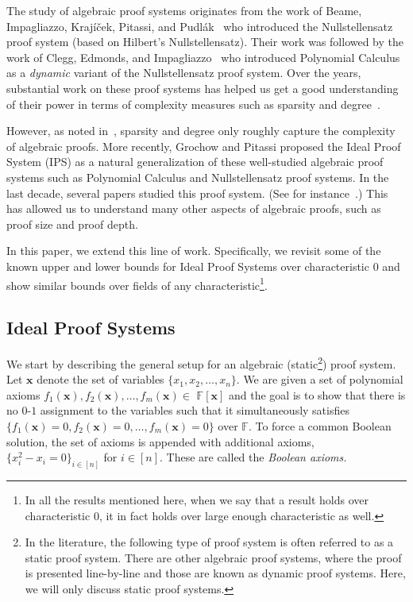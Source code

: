 \documentclass[11pt]{article}
\newcommand{\xbar}{\mathbf{x}}
\begin{document}
The study of algebraic proof systems originates from the work of Beame, Impagliazzo, Kraj\'{i}\v{c}ek, Pitassi, and Pudl\'{a}k~\cite{BIKPP94}  who introduced the Nullstellensatz proof system (based on Hilbert's Nullstellensatz). Their work was followed by the work of Clegg, Edmonds, and Impagliazzo~\cite{CEI96} who introduced Polynomial Calculus as a \emph{dynamic} variant of the Nullstellensatz proof system. Over the years, substantial work on these proof systems has helped us get a good understanding of their power in terms of complexity measures such as sparsity and degree~\cite{BIKPP94,BIPRS97,Razborov98,Grigoriev98,IPS99,BGIP01,AR2001}. 

However, as noted in~\cite{FSTW21}, sparsity and degree only roughly capture the complexity of algebraic proofs. More recently, Grochow and Pitassi \cite{GP14} proposed the Ideal Proof System (IPS) as a natural generalization of these well-studied algebraic proof systems such as Polynomial Calculus and Nullstellensatz proof systems. In the last decade, several papers studied this proof system. (See for instance~\cite{GP14,PitassiTzameretSurvey,FSTW21,GHT,HLT24}.) This has allowed us to understand many other aspects of algebraic proofs, such as proof size and proof depth. 

In this paper, we extend this line of work. Specifically, we revisit some of the known upper and lower bounds for Ideal Proof Systems over characteristic $0$ and show similar bounds over fields of any characteristic\footnote{In all the results mentioned here, when we say that a result holds over characteristic $0$, it in fact holds over large enough characteristic as well.}. 



\subsection{Ideal Proof Systems}
\label{sec:intro-ips}

We start by describing the general setup for an algebraic (static\footnote{In the literature, the following type of proof system is often referred to as a static proof system. There are other algebraic proof systems, where the proof is presented line-by-line and those are known as dynamic proof systems. Here, we will only discuss static proof systems.}) proof system. Let $\xbar$ denote the set of variables $\{x_1, x_2, \ldots, x_n\}$. We are given a set of polynomial axioms $f_1(\mathbf{x}), f_2(\mathbf{x}), \ldots, f_m(\mathbf{x}) \in$ $\mathbb{F}[\mathbf{x}]$ and the goal is to show that there is no $0$-$1$ assignment to the variables such that it simultaneously satisfies $\{f_1(\mathbf{x}) = 0, f_2(\mathbf{x}) = 0, \ldots, f_m(\mathbf{x}) = 0\}$ over $\mathbb{F}$. To force a common Boolean solution, the set of axioms is appended with additional axioms, $\{x_i^2 - x_i =0\}_{i \in [n]}$ for $i \in [n]$. These are called the \emph{Boolean axioms.} 
\end{document}
